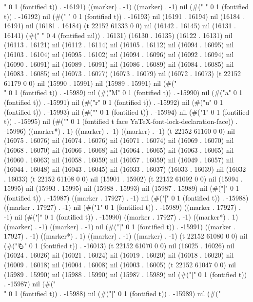 " 0 1 (fontified t)) . -16191) ((marker) . -1) ((marker) . -1) nil (#(" " 0 1 (fontified t)) . -16192) nil (#(" " 0 1 (fontified t)) . -16193) nil (16191 . 16194) nil (16184 . 16191) nil (16181 . 16184) (t 22152 61333 0 0) nil (16142 . 16145) nil (16131 . 16141) (#("    " 0 4 (fontified nil)) . 16131) (16130 . 16135) (16122 . 16131) nil (16113 . 16121) nil (16112 . 16114) nil (16105 . 16112) nil (16094 . 16095) nil (16103 . 16104) nil (16095 . 16102) nil (16094 . 16096) nil (16092 . 16094) nil (16090 . 16091) nil (16089 . 16091) nil (16086 . 16089) nil (16084 . 16085) nil (16083 . 16085) nil (16073 . 16077) (16073 . 16079) nil (16072 . 16073) (t 22152 61179 0 0) nil (15990 . 15991) nil (15989 . 15991) nil (#("\\" 0 1 (fontified t)) . -15989) nil (#("M" 0 1 (fontified t)) . -15990) nil (#("a" 0 1 (fontified t)) . -15991) nil (#("r" 0 1 (fontified t)) . -15992) nil (#("u" 0 1 (fontified t)) . -15993) nil (#("{" 0 1 (fontified t)) . -15994) nil (#("1" 0 1 (fontified t)) . -15995) nil (#("}" 0 1 (fontified t face YaTeX-font-lock-declaration-face)) . -15996) ((marker*) . 1) ((marker) . -1) ((marker) . -1) (t 22152 61160 0 0) nil (16075 . 16076) nil (16074 . 16076) nil (16071 . 16074) nil (16069 . 16070) nil (16068 . 16070) nil (16066 . 16068) nil (16064 . 16065) nil (16063 . 16065) nil (16060 . 16063) nil (16058 . 16059) nil (16057 . 16059) nil (16049 . 16057) nil (16044 . 16048) nil (16043 . 16045) nil (16033 . 16037) (16033 . 16039) nil (16032 . 16033) (t 22152 61108 0 0) nil (15901 . 15902) (t 22152 61092 0 0) nil (15994 . 15995) nil (15993 . 15995) nil (15988 . 15993) nil (15987 . 15989) nil (#("[" 0 1 (fontified t)) . -15987) ((marker . 17927) . -1) nil (#("[" 0 1 (fontified t)) . -15988) ((marker . 17927) . -1) nil (#("1" 0 1 (fontified t)) . -15989) ((marker . 17927) . -1) nil (#("]" 0 1 (fontified t)) . -15990) ((marker . 17927) . -1) ((marker*) . 1) ((marker) . -1) ((marker) . -1) nil (#("]" 0 1 (fontified t)) . -15991) ((marker . 17927) . -1) ((marker*) . 1) ((marker) . -1) ((marker) . -1) (t 22152 61080 0 0) nil (#("も" 0 1 (fontified t)) . -16013) (t 22152 61070 0 0) nil (16025 . 16026) nil (16024 . 16026) nil (16021 . 16024) nil (16019 . 16020) nil (16018 . 16020) nil (16009 . 16018) nil (16004 . 16008) nil (16003 . 16005) (t 22152 61047 0 0) nil (15989 . 15990) nil (15988 . 15990) nil (15987 . 15989) nil (#("[" 0 1 (fontified t)) . -15987) nil (#("\\" 0 1 (fontified t)) . -15988) nil (#("[" 0 1 (fontified t)) . -15989) nil (#("
